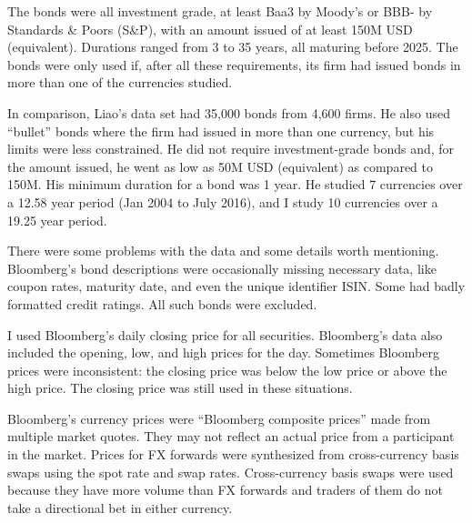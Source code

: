 The bonds were all investment grade, at least Baa3 by Moody's or BBB- by Standards \& Poors (S\&P), with an amount issued of at least 150M USD (equivalent).   Durations ranged from 3 to 35 years, all maturing before 2025.  The bonds were only used if, after all these requirements, its firm had issued bonds in more than one of the currencies studied.  %



In comparison, Liao's data set had 35,000 bonds from 4,600 firms.  He also used ``bullet'' bonds where the firm had issued in more than one currency, but his limits were less constrained.   He did not require investment-grade bonds and, for the amount issued, he went as low as 50M USD (equivalent) as compared to 150M.  His minimum duration for a bond was 1 year.   He studied 7 currencies over a 12.58 year period (Jan 2004 to July 2016), and I study 10 currencies over a 19.25 year period.

There were some problems with the data and some details worth mentioning.  Bloomberg's bond descriptions were occasionally missing necessary data, like coupon rates, maturity date, and even the unique identifier ISIN.  Some had badly formatted credit ratings.  All such bonds were excluded.


I used Bloomberg's daily closing price for all securities.  Bloomberg's data also included the opening, low, and high prices for the day.  Sometimes Bloomberg prices were inconsistent: the closing price was below the low price or above the high price.  The closing price was still used in these situations.  


Bloomberg's currency prices were ``Bloomberg composite prices'' made from multiple market quotes.  They may not reflect an actual price from a participant in the market.  Prices for FX forwards were synthesized from cross-currency basis swaps using the spot rate and swap rates.  Cross-currency basis swaps were used because they have more volume than FX forwards and traders of them do not take a directional bet in either currency.  

